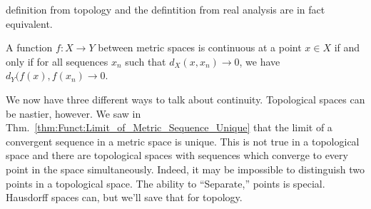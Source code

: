     definition from topology and the defintition
    from real analysis are in fact equivalent.
    \begin{theorem}
        A function $f:X\rightarrow{Y}$ between
        metric spaces is continuous at a point
        $x\in{X}$ if and only if for all
        sequences $x_{n}$ such that
        $d_{X}(x,x_{n})\rightarrow{0}$, we have
        $d_{Y}(f(x),f(x_{n})\rightarrow{0}$.
    \end{theorem}
    We now have three different ways to talk
    about continuity. Topological spaces can be
    nastier, however. We saw in
    Thm.~\ref{thm:Funct:Limit_of_Metric_Sequence_Unique}
    that the limit of a convergent sequence in a
    metric space is unique.
    This is not true in a topological space and there
    are topological spaces with sequences
    which converge to every point in the
    space simultaneously. Indeed, it may be impossible
    to distinguish two points in a topological
    space. The ability to
    ``Separate,'' points is special.
    Hausdorff spaces can, but
    we'll save that for topology.
